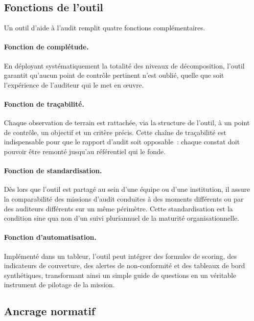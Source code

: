 \subsection{Fonctions de l'outil}

Un outil d'aide à l'audit remplit quatre fonctions complémentaires.

\paragraph{Fonction de complétude.}
En déployant systématiquement la totalité des niveaux de décomposition, l'outil
garantit qu'aucun point de contrôle pertinent n'est oublié, quelle que soit
l'expérience de l'auditeur qui le met en œuvre.

\paragraph{Fonction de traçabilité.}
Chaque observation de terrain est rattachée, via la structure de l'outil, à un
point de contrôle, un objectif et un critère précis. Cette chaîne de traçabilité
est indispensable pour que le rapport d'audit soit opposable~: chaque constat
doit pouvoir être remonté jusqu'au référentiel qui le fonde.

\paragraph{Fonction de standardisation.}
Dès lors que l'outil est partagé au sein d'une équipe ou d'une institution, il
assure la comparabilité des missions d'audit conduites à des moments différents
ou par des auditeurs différents sur un même périmètre. Cette standardisation est
la condition sine qua non d'un suivi pluriannuel de la maturité organisationnelle.

\paragraph{Fonction d'automatisation.}
Implémenté dans un tableur, l'outil peut intégrer des formules de scoring, des
indicateurs de couverture, des alertes de non-conformité et des tableaux de bord
synthétiques, transformant ainsi un simple guide de questions en un véritable
instrument de pilotage de la mission.

\subsection{Ancrage normatif}

